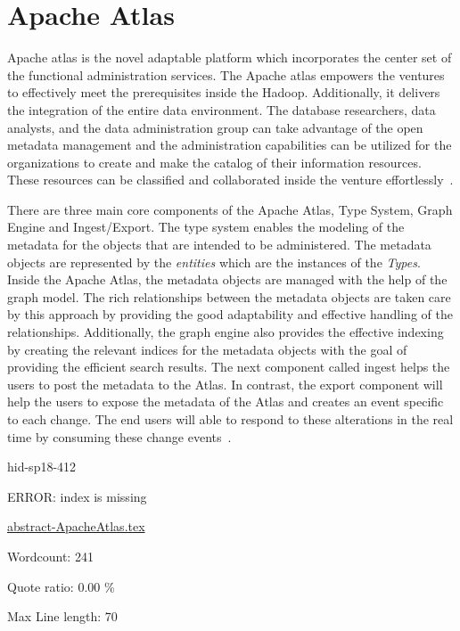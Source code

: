 \section{Apache Atlas}

Apache atlas is the novel adaptable platform which incorporates the
center set of the functional administration services. The Apache atlas
empowers the ventures to effectively meet the prerequisites inside the
Hadoop.  Additionally, it delivers the integration of the entire data
environment.  The database researchers, data analysts, and the data
administration group can take advantage of the open metadata
management and the administration capabilities can be utilized for the
organizations to create and make the catalog of their information
resources. These resources can be classified and collaborated inside
the venture effortlessly~\cite{hid-sp18-412-Apache_Atlas_by_Maven}.

There are three main core components of the Apache Atlas, Type System,
Graph Engine and Ingest/Export. The type system enables the modeling
of the metadata for the objects that are intended to be administered.
The metadata objects are represented by the \textit{entities} which
are the instances of the \textit{Types}. Inside the Apache Atlas, the
metadata objects are managed with the help of the graph model. The
rich relationships between the metadata objects are taken care by this
approach by providing the good adaptability and effective handling of
the relationships. Additionally, the graph engine also provides the
effective indexing by creating the relevant indices for the metadata
objects with the goal of providing the efficient search results. The
next component called ingest helps the users to post the metadata to
the Atlas. In contrast, the export component will help the users to
expose the metadata of the Atlas and creates an event specific to each
change. The end users will able to respond to these alterations in the
real time by consuming these change
events~\cite{hid-sp18-412-Apache_Atlas_architecture}.



\begin{IU}

hid-sp18-412

ERROR: index is missing

\href{https://github.com/cloudmesh-community/hid-sp18-412/blob/master//technology/abstract-ApacheAtlas.tex}{abstract-ApacheAtlas.tex}

 

Wordcount: 241


Quote ratio: 0.00 \%
 
Max Line length: 70
\end{IU}

